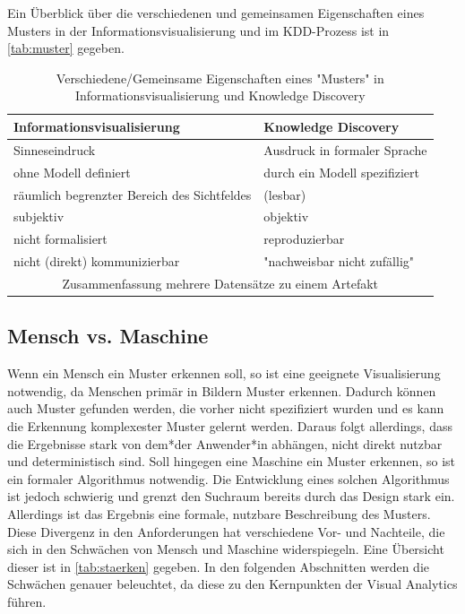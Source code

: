 		Ein Überblick über die verschiedenen und gemeinsamen Eigenschaften eines Musters in der Informationsvisualisierung und im KDD-Prozess ist in \autoref{tab:muster} gegeben.

		\begin{table}
			\centering
			\begin{tabular}{l|l}
				\toprule
				\textbf{Informationsvisualisierung}         & \textbf{Knowledge Discovery}  \\ \midrule
				Sinneseindruck                              & Ausdruck in formaler Sprache  \\
				ohne Modell definiert                       & durch ein Modell spezifiziert \\
				räumlich begrenzter Bereich des Sichtfeldes & (lesbar)                      \\
				subjektiv                                   & objektiv                      \\
				nicht formalisiert                          & reproduzierbar                \\
				nicht (direkt) kommunizierbar               & "nachweisbar nicht zufällig"  \\
				 \multicolumn{2}{c}{Zusammenfassung mehrere Datensätze zu einem Artefakt}   \\ \bottomrule
			\end{tabular}
			\caption{Verschiedene/Gemeinsame Eigenschaften eines "Musters" in Informationsvisualisierung und Knowledge Discovery}
			\label{tab:muster}
		\end{table}

		\subsection{Mensch vs. Maschine}
			Wenn ein Mensch ein Muster erkennen soll, so ist eine geeignete Visualisierung notwendig, da Menschen primär in Bildern Muster erkennen. Dadurch können auch Muster gefunden werden, die vorher nicht spezifiziert wurden und es kann die Erkennung komplexester Muster gelernt werden. Daraus folgt allerdings, dass die Ergebnisse stark von dem*der Anwender*in abhängen, nicht direkt nutzbar und deterministisch sind. Soll hingegen eine Maschine ein Muster erkennen, so ist ein formaler Algorithmus notwendig. Die Entwicklung eines solchen Algorithmus ist jedoch schwierig und grenzt den Suchraum bereits durch das Design stark ein. Allerdings ist das Ergebnis eine formale, nutzbare Beschreibung des Musters. Diese Divergenz in den Anforderungen hat verschiedene Vor- und Nachteile, die sich in den Schwächen von Mensch und Maschine widerspiegeln. Eine Übersicht dieser ist in \autoref{tab:staerken} gegeben. In den folgenden Abschnitten werden die Schwächen genauer beleuchtet, da diese zu den Kernpunkten der Visual Analytics führen.

